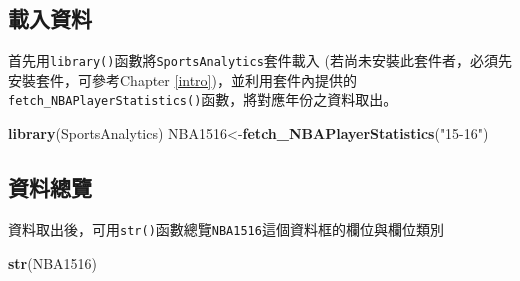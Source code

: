 \documentclass[]{book}
\newenvironment{Shaded}{\begin{snugshade}}{\end{snugshade}}
\newcommand{\KeywordTok}[1]{\textcolor[rgb]{0.13,0.29,0.53}{\textbf{{#1}}}}
\newcommand{\StringTok}[1]{\textcolor[rgb]{0.31,0.60,0.02}{{#1}}}
\newcommand{\NormalTok}[1]{{#1}}
\begin{document}
\subsection{載入資料}

首先用\texttt{library()}函數將\texttt{SportsAnalytics}套件載入
(若尚未安裝此套件者，必須先安裝套件，可參考Chapter
\ref{intro})，並利用套件內提供的\texttt{fetch\_NBAPlayerStatistics()}函數，將對應年份之資料取出。

\begin{Shaded}
\begin{Highlighting}[]
\KeywordTok{library}\NormalTok{(SportsAnalytics)}
\NormalTok{NBA1516<-}\KeywordTok{fetch_NBAPlayerStatistics}\NormalTok{(}\StringTok{"15-16"}\NormalTok{)}
\end{Highlighting}
\end{Shaded}

\subsection{資料總覽}

資料取出後，可用\texttt{str()}函數總覽\texttt{NBA1516}這個資料框的欄位與欄位類別

\begin{Shaded}
\begin{Highlighting}[]
\KeywordTok{str}\NormalTok{(NBA1516)}
\end{Highlighting}
\end{Shaded}
\end{document}
